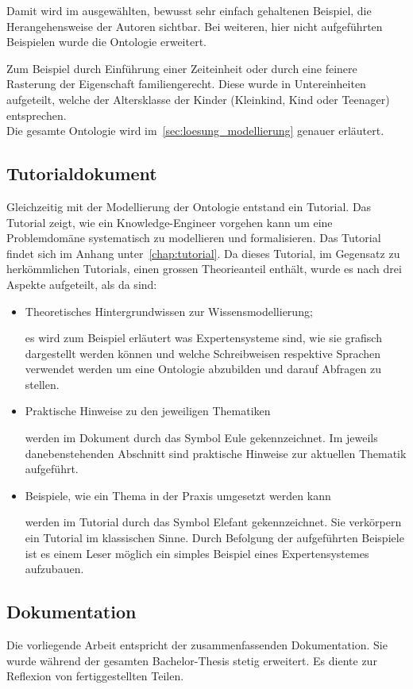 Damit wird im ausgewählten, bewusst sehr einfach gehaltenen Beispiel, die Herangehensweise der Autoren sichtbar. Bei weiteren, hier nicht aufgeführten Beispielen wurde die Ontologie erweitert.

Zum Beispiel durch Einführung einer Zeiteinheit oder durch eine feinere Rasterung der Eigenschaft familiengerecht. Diese wurde in Untereinheiten aufgeteilt, welche der Altersklasse der Kinder (Kleinkind, Kind oder Teenager) entsprechen.\\
Die gesamte Ontologie wird im~\autoref{sec:loesung_modellierung} genauer erläutert.

\subsection{Tutorialdokument}
\label{subsec:dokumentation_wissensmodellierung}
Gleichzeitig mit der Modellierung der Ontologie entstand ein Tutorial. Das Tutorial zeigt, wie ein Knowledge-Engineer vorgehen kann um eine Problemdomäne systematisch zu modellieren und formalisieren. Das Tutorial findet sich im Anhang unter~\ref{chap:tutorial}. Da dieses  Tutorial, im Gegensatz zu herkömmlichen Tutorials, einen grossen Theorieanteil enthält, wurde es nach drei Aspekte aufgeteilt, als da sind:
\begin{itemize}
    \item Theoretisches Hintergrundwissen zur Wissensmodellierung;

        es wird zum Beispiel erläutert was Expertensysteme sind, wie sie grafisch dargestellt werden können und welche Schreibweisen respektive Sprachen verwendet werden um eine Ontologie abzubilden und darauf Abfragen zu stellen.

    \item Praktische Hinweise zu den jeweiligen Thematiken

        werden im Dokument durch das Symbol Eule gekennzeichnet. Im jeweils danebenstehenden Abschnitt sind praktische Hinweise zur aktuellen Thematik aufgeführt.

    \item Beispiele, wie ein Thema in der Praxis umgesetzt werden kann

        werden im Tutorial durch das Symbol Elefant gekennzeichnet. Sie verkörpern ein Tutorial im klassischen Sinne. Durch Befolgung der aufgeführten Beispiele ist es einem Leser möglich ein simples Beispiel eines Expertensystemes aufzubauen.
\end{itemize}

\subsection{Dokumentation}
\label{subsec:abschliessende_dokumentation}
Die vorliegende Arbeit entspricht der zusammenfassenden Dokumentation. Sie wurde während der gesamten Bachelor-Thesis stetig erweitert. Es diente zur Reflexion von fertiggestellten Teilen.
